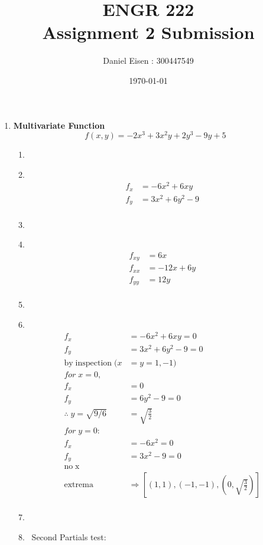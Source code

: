 \documentclass[11pt]{article}
\title{ENGR 222 \\ Assignment 2 Submission}
\author{Daniel Eisen : 300447549}
\date{\today}
\newcommand\Item[1][]{%
  \ifx\relax#1\relax  \item \else \item[#1] \fi
  \abovedisplayskip=0pt\abovedisplayshortskip=0pt~\vspace*{-\baselineskip}}
\begin{document}
\maketitle
\begin{enumerate}
    \item \textbf{Multivariate Function}
          $$f(x,y) = -2x^{3} + 3x^{2}y + 2y^{3} - 9y + 5$$
          \begin{enumerate}
              \Item
              \begin{align*}
                  f_{x} & = -6x^{2} + 6xy       \\
                  f_{y} & = 3x^{2} + 6y^{2} - 9 \\
              \end{align*}
              \Item
              \begin{align*}
                  f_{xy} & = 6x        \\
                  f_{xx} & = -12x + 6y \\
                  f_{yy} & = 12y       \\
              \end{align*}
              \Item
              \begin{align*}
                  f_x &= -6x^{2} + 6xy = 0 \\
                  f_y &= 3x^{2} + 6y^{2} - 9 = 0 \\
                  \mathrm{by \; inspection \;}  (x&=y=1,-1) \\
                  for \; x=0, \\ 
                  f_x &= 0 \\
                  f_y &= 6y^2 - 9 = 0 \\
                  \therefore \; y = \sqrt{9/6} &= \sqrt{\frac{3}{2}} \\
                  for \; y=0: \\
                   f_x &= -6x^2 = 0 \\
                   f_y &= 3x^2 - 9 = 0 \\
                   \mathrm{no \; x} \\
                \mathrm{extrema} &\Rightarrow [(1,1), (-1,-1), (0,\sqrt{\frac{3}{2}})]\\
              \end{align*}
              \Item Second Partials test:

\end{enumerate}
\end{enumerate}
\end{document}
